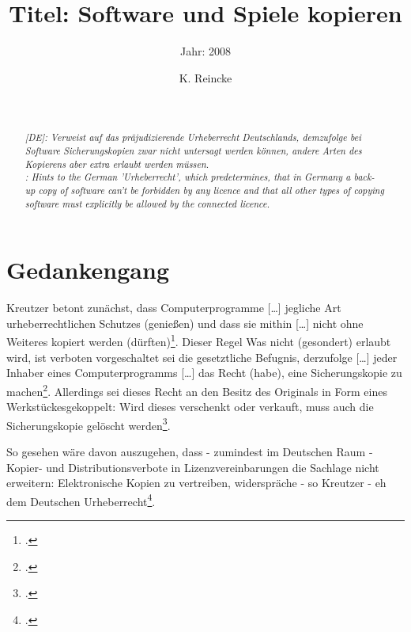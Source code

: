 \documentclass[DIV=calc,BCOR=5mm,11pt,headings=small,oneside,abstract=true, toc=bib]{scrartcl}
\begin{document}

\titlehead{Literaturexzerpt}
\subject{Autor(en): Kreutzer}
\title{Titel: Software und Spiele kopieren}
\subtitle{Jahr: 2008 }
\author{K. Reincke}
\maketitle

\begin{abstract}
\noindent
\cite[(in:)][]{DjoGehGraKreSpi2008a} \\
\noindent
\cite[(ist:)][29 - 33]{Kreutzer2008a} \\
\noindent \itshape
[DE]: Verweist auf das präjudizierende Urheberrecht Deutschlands, demzufolge bei
Software Sicherungskopien zwar nicht untersagt werden können, andere Arten des
Kopierens aber extra erlaubt werden müssen. \\
\noindent
[EN]: Hints to the German ’Urheberrecht’, which predetermines, that in Germany a
back- up copy of software can’t be forbidden by any licence and that all other
types of copying software must explicitly be allowed by the connected licence.
\end{abstract}
\footnotesize
\normalsize

\section{Gedankengang}

Kreutzer betont zunächst, dass Computerprogramme \glqq{}[\ldots] jegliche Art
urheberrechtlichen Schutzes (genießen)\grqq{} und dass sie mithin
\glqq{}[\ldots] nicht ohne Weiteres kopiert werden
(dürften)\grqq{}\footcite[vgl.][29]{Kreutzer2008a}. Dieser Regel \glq{}Was
nicht (gesondert) erlaubt wird, ist verboten\grq{} vorgeschaltet sei die
\glqq{}gesetztliche Befugnis\grqq{}, derzufolge \glqq{}[\ldots] jeder Inhaber
eines Computerprogramms [\ldots] das Recht (habe), eine Sicherungskopie zu
machen\grqq{}\footcite[vgl.][29]{Kreutzer2008a}. Allerdings sei dieses Recht
an den Besitz des Originals in Form eines \glqq{}Werkstückes\grqq{}gekoppelt:
Wird dieses verschenkt oder verkauft, muss auch die Sicherungskopie gelöscht
werden\footcite[vgl.][30]{Kreutzer2008a}.

So gesehen wäre davon auszugehen, dass - zumindest im Deutschen Raum - Kopier-
und Distributionsverbote in Lizenzvereinbarungen die Sachlage nicht erweitern:
Elektronische Kopien zu vertreiben, widerspräche - so Kreutzer - eh dem
Deutschen Urheberrecht\footcite[vgl. dazu][30]{Kreutzer2008a}.
\end{document}
